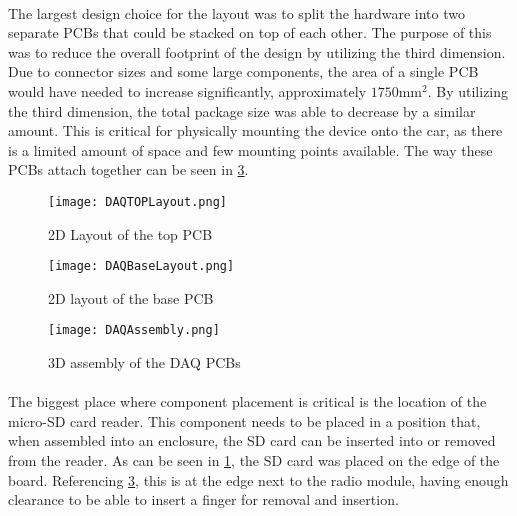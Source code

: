 \paragraph{}
The largest design choice for the layout was to split the hardware into two separate PCBs that could be stacked on top of each other.
The purpose of this was to reduce the overall footprint of the design by utilizing the third dimension.
Due to connector sizes and some large components, the area of a single PCB would have needed to increase significantly, approximately $1750\text{mm}^2$.  By utilizing the third dimension, the total package size was able to decrease by a similar amount.
This is critical for physically mounting the device onto the car, as there is a limited amount of space and few mounting points available.
The way these PCBs attach together can be seen in \cref{fig:PCBAssembly}.

\begin{figure}[H]
	\centering
	\texttt{[image: DAQTOPLayout.png]}
	\caption{2D Layout of the top PCB}
	\label{fig:TopLayout}
\end{figure}

\begin{figure}[H]
	\centering
	\texttt{[image: DAQBaseLayout.png]}
	\caption{2D layout of the base PCB}
	\label{fig:BaseLayout}
\end{figure}

\begin{figure}[H]
	\centering
	\texttt{[image: DAQAssembly.png]}
	\caption{3D assembly of the DAQ PCBs}
	\label{fig:PCBAssembly}
\end{figure}

\paragraph{}
The biggest place where component placement is critical is the location of the micro-SD card reader.
This component needs to be placed in a position that, when assembled into an enclosure, the SD card can be inserted into or removed from the reader.
As can be seen in \cref{fig:TopLayout}, the SD card was placed on the edge of the board.
Referencing \cref{fig:PCBAssembly}, this is at the edge next to the radio module, having enough clearance to be able to insert a finger for removal and insertion.